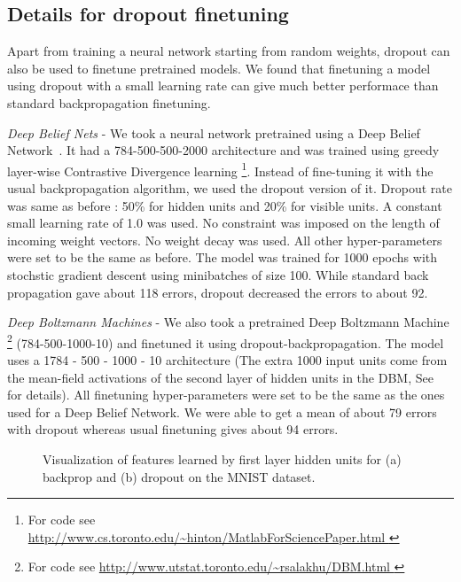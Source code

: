 \documentclass[12pt]{article}
\begin{document}
\subsection{Details for dropout finetuning}
\label{sec:mnist_dropout_pre}
Apart from training a neural network starting from random weights, dropout can
also be used to finetune pretrained models. We found that finetuning a
model using dropout with a small learning rate can give much better performace
than standard backpropagation finetuning.

\emph{Deep Belief Nets} - We took a neural network pretrained using a Deep Belief Network~\cite{Science}.
It had a 784-500-500-2000 architecture and was trained using greedy layer-wise
Contrastive Divergence learning
\footnote{For code see \url{http://www.cs.toronto.edu/~hinton/MatlabForSciencePaper.html } }. Instead of fine-tuning it
with the usual backpropagation algorithm, we used the dropout version of it.
Dropout rate was same as before : 50\% for hidden units and 20\% for
visible units. A constant small learning rate of 1.0 was used. No constraint was imposed on
the length of incoming weight vectors. No weight decay was used. All other
hyper-parameters were set to be the same as before. The model was trained for 1000 epochs
with stochstic gradient descent using minibatches of size 100. While standard
back propagation gave about 118 errors, dropout decreased the errors to about 92.

\emph{Deep Boltzmann Machines} - We also took a pretrained Deep Boltzmann
Machine \cite{DBM} \footnote{ For code see
\url{http://www.utstat.toronto.edu/~rsalakhu/DBM.html }}
(784-500-1000-10) and finetuned it using dropout-backpropagation. The
model uses a 1784 - 500 - 1000 - 10 architecture (The extra 1000 input
units come from the mean-field activations of the second layer of hidden units
in the DBM, See~\cite{DBM} for details).
All finetuning hyper-parameters were set to be the same as the ones used for a Deep Belief Network.
We were able to get a mean of about 79 errors with dropout whereas usual finetuning gives about 94 errors.

\begin{figure}[ht]
\centerline{
}
\caption{Visualization of features learned by first layer hidden units for (a)
backprop and (b) dropout on the MNIST dataset.}
\label{fig:features}
\end{figure}
\end{document}
